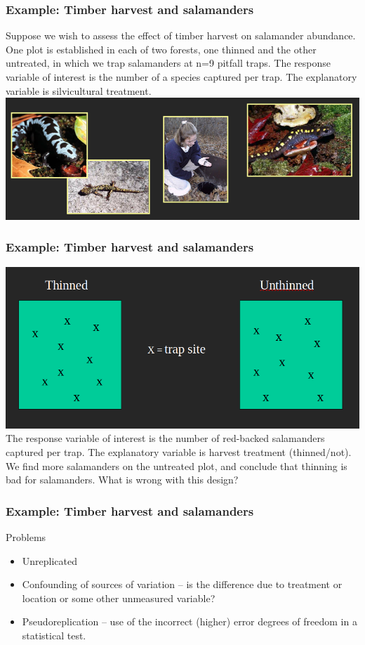 \documentclass[color=usenames,dvipsnames]{beamer}\usepackage[]{graphicx}\usepackage[]{color}
\begin{document}
\begin{frame}
  \frametitle{Example: Timber harvest and salamanders}
  Suppose we wish to assess the effect of timber harvest on salamander
  abundance.  One plot is established in each of two forests, one
  thinned and the other untreated, in which we trap salamanders at n=9
  pitfall traps.  The response variable of interest is the number of a
  species captured per trap.  The explanatory variable is silvicultural
  treatment. \\
  \vfill
  \centering
  \includegraphics[width=\textwidth]{salamanders} \\
\end{frame}


\begin{frame}
  \frametitle{Example: Timber harvest and salamanders}
  \includegraphics[width=\textwidth]{salamander-design} \\
  \vfill
  The response variable of interest is the number of red-backed
  salamanders captured per trap.  The explanatory variable is harvest
  treatment (thinned/not). We find more salamanders on the untreated
  plot, and conclude that thinning is bad for salamanders.  What is
  wrong with this design?  
\end{frame}


\begin{frame}
  \frametitle{Example: Timber harvest and salamanders}
  Problems
  \begin{itemize}
    \item Unreplicated
    \item Confounding of sources of variation -- is the
      difference due to treatment or location or some other unmeasured
      variable?
    \item Pseudoreplication -- use of the incorrect (higher) error
      degrees of freedom in a statistical test. 
  \end{itemize}
\end{frame}
\end{document}
